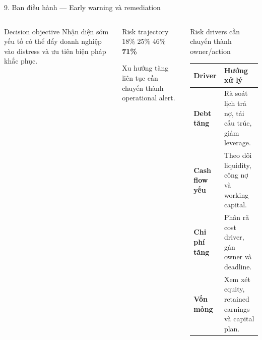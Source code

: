 \documentclass[aspectratio=169,11pt]{beamer}
\newcommand{\bad}[1]{\textcolor{fdred}{\textbf{#1}}}
\begin{document}
\begin{frame}{9. Ban điều hành — Early warning và remediation}
  \small
  \begin{columns}[T,totalwidth=\textwidth]
      \begin{alertblock}{Decision objective}
        Nhận diện sớm yếu tố có thể đẩy doanh nghiệp vào distress và ưu tiên biện pháp khắc phục.
      \end{alertblock}
      \begin{block}{Risk trajectory}
        \centering\large 18\% \textrightarrow{} 25\% \textrightarrow{} 46\% \textrightarrow{} \bad{71\%}
        \par\scriptsize Xu hướng tăng liên tục cần chuyển thành operational alert.
      \end{block}
      \begin{exampleblock}{Risk drivers cần chuyển thành owner/action}
        \scriptsize
        \begin{tabularx}{\linewidth}{>{\bfseries}p{.33\linewidth} X}
          Driver & Hướng xử lý\\\midrule
          Debt tăng & Rà soát lịch trả nợ, tái cấu trúc, giảm leverage.\\
          Cash flow yếu & Theo dõi liquidity, công nợ và working capital.\\
          Chi phí tăng & Phân rã cost driver, gán owner và deadline.\\
          Vốn mỏng & Xem xét equity, retained earnings và capital plan.\\
        \end{tabularx}
      \end{exampleblock}
  \end{columns}
\end{frame}
\end{document}
